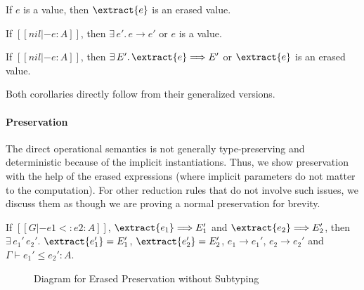 \begin{lemma}
    If $e$ is a value, then $\extract{e}$ is an erased value.
\end{lemma}

\begin{corollary}[Progress]
    If $[[nil |- e : A]]$,
    then $\exists \, e'. \, e \longrightarrow e'$ or $e$ is a value.
\end{corollary}

\begin{corollary}
    If $[[nil |- e : A]]$,
    then $\exists \, E'. \, \extract{e} \Longrightarrow E'$ or $\extract{e}$ is an erased value.
\end{corollary}

Both corollaries directly follow from their generalized versions.

\paragraph{Preservation}
The direct operational semantics is not generally type-preserving and
deterministic because of the implicit instantiations. Thus, we show
preservation with the help of the erased expressions (where implicit parameters
do not matter to the computation). For other reduction rules that do not involve
such issues, we discuss them as though we are proving a normal preservation
for brevity.

\begin{theorem}
    If $[[G |- e1 <: e2 : A]]$, $\extract{e_1} \Longrightarrow E_1'$ and $\extract{e_2} \Longrightarrow E_2'$,
    then $\exists\,e_1' \, e_2'.$ $\extract{e_1'} = E_1'$, $\extract{e_2'} = E_2'$,
    $e_1 \longrightarrow e_1'$, $e_2 \longrightarrow e_2'$ and $\Gamma \vdash e_1' \le e_2' : A$.
\end{theorem}

\begin{figure}
    \centering
    \caption{Diagram for Erased Preservation without Subtyping}
    \label{fig:preservation}
\end{figure}

